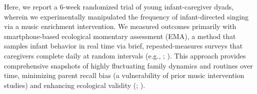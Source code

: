 \documentclass[
]{article}
\begin{document}
Here, we report a 6-week randomized trial of young infant-caregiver
dyads, wherein we experimentally manipulated the frequency of
infant-directed singing via a music enrichment intervention. We measured
outcomes primarily with smartphone-based ecological momentary assessment
(EMA), a method that samples infant behavior in real time via brief,
repeated-measures surveys that caregivers complete daily at random
intervals (e.g., ;
). This approach provides
comprehensive snapshots of highly fluctuating family dynamics and
routines over time, minimizing parent recall bias (a vulnerability of
prior music intervention studies) and enhancing ecological validity
(;
).

\clearpage

\begingroup\fontsize{6}{8}\selectfont
\end{document}
